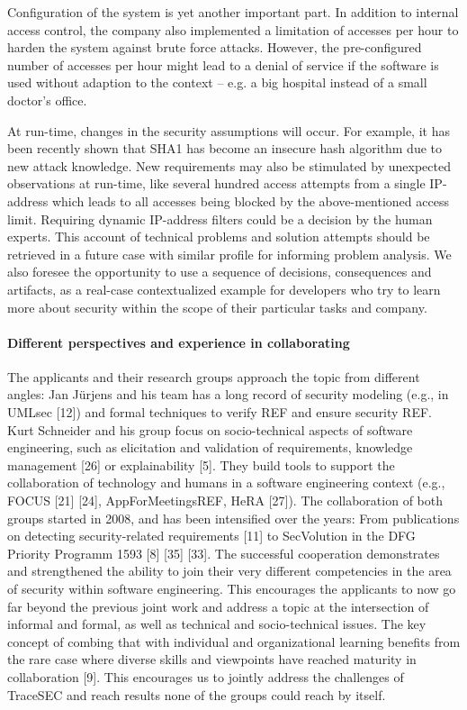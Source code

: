 Configuration of the system is yet another important part. In addition to internal access control, the company also implemented a limitation of accesses per hour to harden the system against brute force attacks. However, the pre-configured number of accesses per hour might lead to a denial of service if the software is used without adaption to the context – e.g. a big hospital instead of a small doctor’s office.

At run-time, changes in the security assumptions will occur. For example, it has been recently shown that SHA1 has become an insecure hash algorithm due to new attack knowledge. New requirements may also be stimulated by unexpected observations at run-time, like several hundred access attempts from a single IP-address which leads to all accesses being blocked by the above-mentioned access limit. Requiring dynamic IP-address filters could be a decision by the human experts. This account of technical problems and solution attempts should be retrieved in a future case with similar profile for informing problem analysis. We also foresee the opportunity to use a sequence of decisions, consequences and artifacts, as a real-case contextualized example for developers who try to learn more about security within the scope of their particular tasks and company.

\paragraph*{Different perspectives and experience in collaborating}
The applicants and their research groups approach the topic from different angles: Jan Jürjens and his team has a long record of security modeling (e.g., in UMLsec [12]) and formal techniques to verify REF and ensure security REF. Kurt Schneider and his group focus on socio-technical aspects of software engineering, such as elicitation and validation of requirements, knowledge management [26] or explainability [5]. They build tools to support the collaboration of technology and humans in a software engineering context (e.g., FOCUS [21] [24], AppForMeetingsREF, HeRA [27]). The collaboration of both groups started in 2008, and has been intensified over the years: From publications on detecting security-related requirements [11] to SecVolution in the DFG Priority Programm 1593  [8] [35] [33]. The successful cooperation demonstrates and strengthened the ability to join their very different competencies in the area of security within software engineering. This encourages the applicants to now go far beyond the previous joint work and address a topic at the intersection of informal and formal, as well as technical and socio-technical issues. The key concept of combing that with individual and organizational learning benefits from the rare case where diverse skills and viewpoints have reached maturity in collaboration [9]. This encourages us to jointly address the challenges of TraceSEC and reach results none of the groups could reach by itself.

